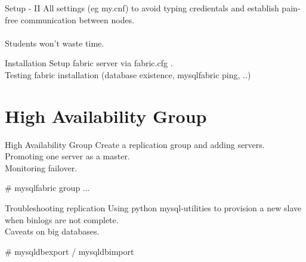 \documentclass{beamer}[10]
\begin{document}
\begin{pyframe}{Setup - II}
All settings (eg my.cnf) to avoid typing credientals
and establish pain-free communication between nodes.
 \\ \\
Students won't waste time.
\end{pyframe}


\begin{pyframe}{Installation}
Setup fabric server via fabric.cfg . \\
Testing fabric installation (database existence, mysqlfabric ping, ..)

\end{pyframe}


\section{High Availability Group}
\begin{pyframe}{High Availability Group}
Create a replication group and adding
servers. \\

Promoting one server as a master. \\

Monitoring failover. \\
\begin{bashcode}
# mysqlfabric group ...
\end{bashcode}
\end{pyframe}


\begin{pyframe}{Troubleshooting replication}
Using python mysql-utilities to provision
 a new slave when binlogs are not complete. \\

 Caveats on big databases. \\


\begin{bashcode}
# mysqldbexport / mysqldbimport
\end{bashcode}
\end{pyframe}
\end{document}
